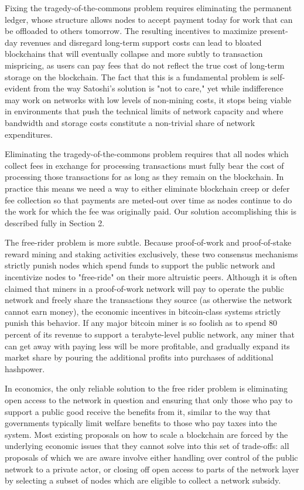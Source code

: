 \documentclass[11.5pt, oneside]{article}   	%
\begin{document}
\begin{multicols}{2}
Fixing the tragedy-of-the-commons problem requires eliminating the permanent ledger, whose structure allows nodes to accept payment today for work that can be offloaded to others tomorrow. The resulting incentives to maximize present-day revenues and disregard long-term support costs can lead to bloated blockchains that will eventually collapse and more subtly to transaction mispricing, as users can pay fees that do not reflect the true cost of long-term storage on the blockchain. The fact that this is a fundamental problem is self-evident from the way Satoshi's solution is "not to care," yet while indifference may work on networks with low levels of non-mining costs, it stops being viable in environments that push the technical limits of network capacity and where bandwidth and storage costs constitute a non-trivial share of network expenditures.

Eliminating the tragedy-of-the-commons problem requires that all nodes which collect fees in exchange for processing transactions must fully bear the cost of processing those transactions for as long as they remain on the blockchain. In practice this means we need a way to either eliminate blockchain creep or defer fee collection so that payments are meted-out over time as nodes continue to do the work for which the fee was originally paid. Our solution accomplishing this is described fully in Section 2.

The free-rider problem is more subtle. Because proof-of-work and proof-of-stake reward mining and staking activities exclusively, these two consensus mechanisms strictly punish nodes which spend funds to support the public network and incentivize nodes to "free-ride" on their more altruistic peers. Although it is often claimed that miners in a proof-of-work network will pay to operate the public network and freely share the transactions they source (as otherwise the network cannot earn money), the economic incentives in bitcoin-class systems strictly punish this behavior. If any major bitcoin miner is so foolish as to spend 80 percent of its revenue to support a terabyte-level public network, any miner that can get away with paying less will be more profitable, and gradually expand its market share by pouring the additional profits into purchases of additional hashpower.

In economics, the only reliable solution to the free rider problem is eliminating open access to the network in question and ensuring that only those who pay to support a public good receive the benefits from it, similar to the way that governments typically limit welfare benefits to those who pay taxes into the system. Most existing proposals on how to scale a blockchain are forced by the underlying economic issues that they cannot solve into this set of trade-offs: all proposals of which we are aware involve either handling over control of the public network to a private actor, or closing off open access to parts of the network layer by selecting a subset of nodes which are eligible to collect a network subsidy.


\end{multicols}
\end{document}
